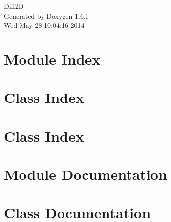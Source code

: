 \documentclass[a4paper]{book}
\begin{document}
\hypersetup{pageanchor=false}
\begin{titlepage}
\vspace*{7cm}
\begin{center}
{\Large Diff2D }\\
\vspace*{1cm}
{\large Generated by Doxygen 1.6.1}\\
\vspace*{0.5cm}
{\small Wed May 28 10:04:16 2014}\\
\end{center}
\end{titlepage}
\clearemptydoublepage
{}
\tableofcontents
\clearemptydoublepage
{}
\hypersetup{pageanchor=true}
\chapter{Module Index}

\chapter{Class Index}

\chapter{Class Index}

\chapter{Module Documentation}

\chapter{Class Documentation}


















\printindex
\end{document}
